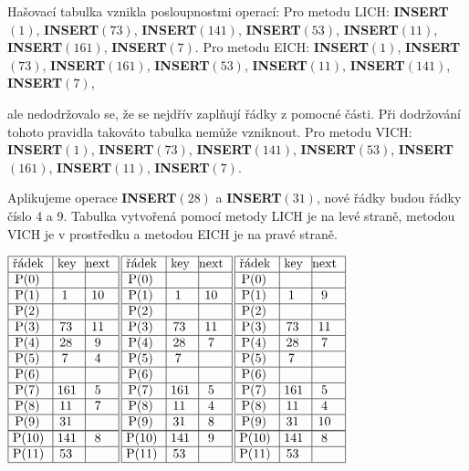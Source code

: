 \documentclass[a4paper,12pt]{article}
\begin{document}
Hašovací tabulka vznikla posloupnostmi operací:\newline 
Pro metodu LICH:\newline 
{\bf INSERT$(1)$}, {\bf INSERT$(73)$}, {\bf INSERT$(141)$}, 
{\bf INSERT$(53)$}, {\bf INSERT$(11)$},\newline 
{\bf INSERT$(161)$}, {\bf INSERT$(7)$}.\newline 
Pro metodu EICH:\newline 
{\bf INSERT$(1)$}, {\bf INSERT$(73)$}, {\bf INSERT$(161)$}, 
{\bf INSERT$(53)$}, {\bf INSERT$(11)$},\newline 
{\bf INSERT$(141)$}, {\bf INSERT$(7)$},

ale nedodržovalo se, že se nejdřív zaplňují řádky z 
pomocné části.  Při dodržování tohoto pravidla takováto tabulka 
nemůže vznik\-nout.\newline 
Pro metodu VICH:\newline 
{\bf INSERT$(1)$}, {\bf INSERT$(73)$}, {\bf INSERT$(141)$}, 
{\bf INSERT$(53)$}, {\bf INSERT$(161)$},\newline 
{\bf INSERT$(11)$}, {\bf INSERT$(7)$}. 

Aplikujeme operace {\bf INSERT$(28)$} a {\bf INSERT$(31
)$}, nové řád\-ky 
budou řádky číslo 4 a 9. Tabulka vytvořená pomocí 
metody LICH je na levé straně, metodou VICH je v 
prostředku a metodou EICH je na pravé straně.

$\vbox {\hbox{\vtop{\offinterlineskip\halign{\strut\vrule\ # & \vrule\ # & \vrule\hfil # \hfil\vrule\cr\noalign{\hrule}řádek & key & next \hfil\cr\noalign{\hrule}P(0) & &\hfill \cr\noalign{\hrule}P(1) & 1 & 10 \cr\noalign{\hrule}P(2) & &\hfill \cr\noalign{\hrule}P(3) & 73 & 11 \cr\noalign{\hrule}P(4) & 28 & 9 \cr\noalign{\hrule}P(5) & 7 & 4 \cr\noalign{\hrule}P(6) &  &\hfill \cr\noalign{\hrule}P(7) & 161 & 5 \cr\noalign{\hrule}P(8) & 11 & 7 \cr\noalign{\hrule}P(9) & 31 &\hfill \cr\noalign{\hrule}\noalign{\hrule}P(10) & 141 & 8 \cr\noalign{\hrule}P(11) & 53 & \hfill \cr\noalign{\hrule}}}\,\vtop{\offinterlineskip\halign{\strut\vrule\ # & \vrule\ # & \vrule\hfil# \hfil\vrule\cr\noalign{\hrule}řádek & key & next \hfil\cr\noalign{\hrule}P(0) & &\hfill \cr\noalign{\hrule}P(1) & 1 & 10 \cr\noalign{\hrule}P(2) & &\hfill \cr\noalign{\hrule}P(3) & 73 & 11 \cr\noalign{\hrule}P(4) & 28 & 7 \cr\noalign{\hrule}P(5) & 7 & \hfill \cr\noalign{\hrule}P(6) &  &\hfill \cr\noalign{\hrule}P(7) & 161 & 5 \cr\noalign{\hrule}P(8) & 11 & 4 \cr\noalign{\hrule}P(9) & 31 & 8 \cr\noalign{\hrule}\noalign{\hrule}P(10) & 141 & 9 \cr\noalign{\hrule}P(11) & 53 & \hfill \cr\noalign{\hrule}}}\,\vtop{\offinterlineskip\halign {\strut\vrule\ # & \vrule\ # & \vrule \hfil # \hfil \vrule\cr\noalign{\hrule}řádek & key & next \hfil \cr\noalign{\hrule}P(0) & &\hfill \cr\noalign{\hrule}P(1) & 1 & 9 \cr\noalign{\hrule}P(2) & &\hfill \cr\noalign{\hrule}P(3) & 73 & 11 \cr\noalign{\hrule}P(4) & 28 & 7 \cr\noalign{\hrule}P(5) & 7 & \hfill \cr\noalign{\hrule}P(6) & & \hfill \cr\noalign{\hrule}P(7) & 161 & 5 \cr\noalign{\hrule}P(8) & 11 & 4  \cr\noalign{\hrule}P(9) & 31 & 10 \cr\noalign{\hrule}\noalign{\hrule}P(10) & 141 & 8 \cr\noalign{\hrule}P(11) & 53 & \hfill \cr\noalign{\hrule}}}}}$
\end{document}
